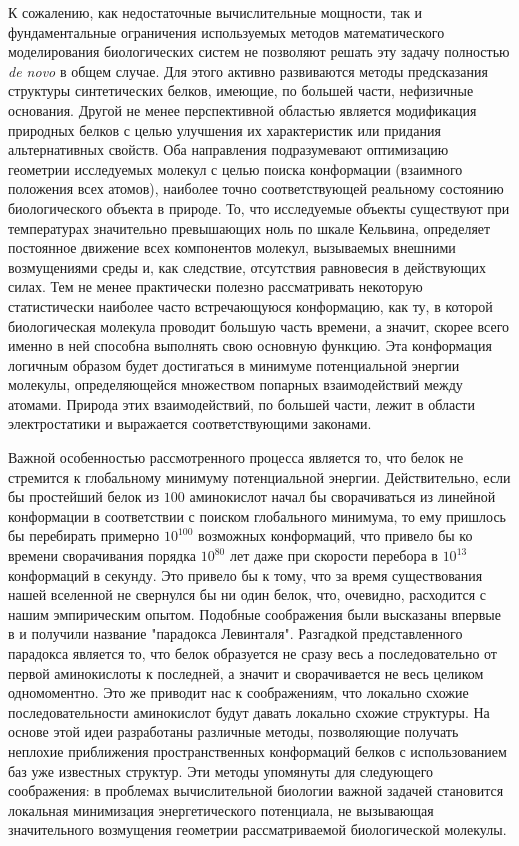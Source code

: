   К сожалению, как недостаточные вычислительные мощности, так и фундаментальные ограничения используемых методов математического моделирования биологических систем не позволяют решать эту задачу полностью \textit{de novo} в общем случае.
  Для этого активно развиваются методы предсказания структуры синтетических белков, имеющие, по большей части, нефизичные основания.
  Другой не менее перспективной областью является модификация природных белков с целью улучшения их характеристик или придания альтернативных свойств.
  Оба направления подразумевают оптимизацию геометрии исследуемых молекул с целью поиска конформации (взаимного положения всех атомов), наиболее точно соответствующей реальному состоянию биологического объекта в природе.
  То, что исследуемые объекты существуют при температурах значительно превышающих ноль по шкале Кельвина, определяет постоянное движение всех компонентов молекул, вызываемых внешними возмущениями среды и, как следствие, отсутствия равновесия в действующих силах.
  Тем не менее практически полезно рассматривать некоторую статистически наиболее часто встречающуюся конформацию, как ту, в которой биологическая молекула проводит большую часть времени, а значит, скорее всего именно в ней способна выполнять свою основную функцию.
  Эта конформация логичным образом будет достигаться в минимуме потенциальной энергии молекулы, определяющейся множеством попарных взаимодействий между атомами.
  Природа этих взаимодействий, по большей части, лежит в области электростатики и выражается соответствующими законами.

  Важной особенностью рассмотренного процесса является то, что белок не стремится к глобальному минимуму потенциальной энергии.
  Действительно, если бы простейший белок из $100$ аминокислот начал бы сворачиваться из линейной конформации в соответствии с поиском глобального минимума, то ему пришлось бы перебирать примерно $10^{100}$ возможных конформаций, что привело бы ко времени сворачивания порядка $10^{80}$ лет даже при скорости перебора в $10^{13}$ конформаций в секунду.
  Это привело бы к тому, что за время существования нашей вселенной не свернулся бы ни один белок, что, очевидно, расходится с нашим эмпирическим опытом.
  Подобные соображения были высказаны впервые в \cite{levinthal1969} и получили название "парадокса Левинталя".
  Разгадкой представленного парадокса является то, что белок образуется не сразу весь а последовательно от первой аминокислоты к последней, а значит и сворачивается не весь целиком одномоментно.
  Это же приводит нас к соображениям, что локально схожие последовательности аминокислот будут давать локально схожие структуры.
  На основе этой идеи разработаны различные методы, позволяющие получать неплохие приближения пространственных конформаций белков с использованием баз уже известных структур.
  Эти методы упомянуты для следующего соображения: в проблемах вычислительной биологии важной задачей становится локальная минимизация энергетического потенциала, не вызывающая значительного возмущения геометрии рассматриваемой биологической молекулы.

